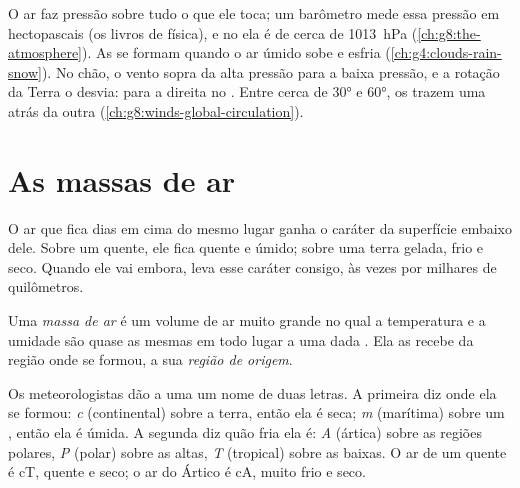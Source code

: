 \begin{recall}
O ar faz pressão sobre tudo o que ele toca; um barômetro mede essa
pressão em hectopascais (os livros de física), e no  ela é de
cerca de \qty{1013}{hPa} (\cref{ch:g8:the-atmosphere}). As  se
formam quando o ar úmido sobe e esfria (\cref{ch:g4:clouds-rain-snow}).
No chão, o vento sopra da alta pressão para a baixa pressão, e a rotação
da Terra o desvia: para a direita no . Entre cerca de
\ang{30} e \ang{60}, os  trazem uma  atrás da
outra (\cref{ch:g8:winds-global-circulation}).
\end{recall}

\section{As massas de ar}

O ar que fica dias em cima do mesmo lugar ganha o caráter da superfície
embaixo dele. Sobre um  quente, ele fica quente e úmido; sobre uma
terra gelada, frio e seco. Quando ele vai embora, leva esse caráter
consigo, às vezes por milhares de quilômetros.

\begin{definition}[Massa de ar]\label{def:g8:fronts-and-weather-maps:air-mass}
Uma \emph{massa de ar} é um volume de ar muito grande
no qual a temperatura e a umidade são quase as mesmas em todo lugar a uma
dada . Ela as recebe da região onde se formou, a sua
\emph{região de origem}.
\end{definition}

Os meteorologistas dão a uma  um nome de duas letras. A
primeira diz onde ela se formou: \emph{c} (continental) sobre a terra,
então ela é seca; \emph{m} (marítima) sobre um , então ela é úmida.
A segunda diz quão fria ela é: \emph{A} (ártica) sobre as regiões
polares, \emph{P} (polar) sobre as  altas, \emph{T} (tropical)
sobre as  baixas. O ar de um  quente é cT, quente e seco;
o ar do Ártico é cA, muito frio e seco.


